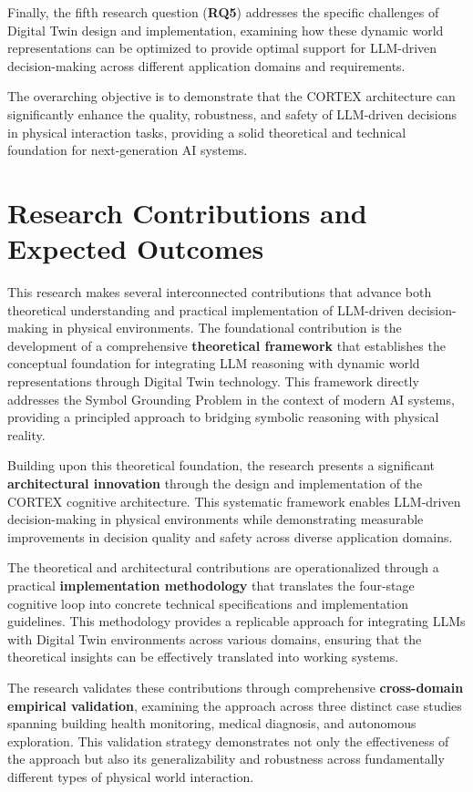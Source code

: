 Finally, the fifth research question (\textbf{RQ5}) addresses the specific challenges of Digital Twin design and implementation, examining how these dynamic world representations can be optimized to provide optimal support for LLM-driven decision-making across different application domains and requirements.

The overarching objective is to demonstrate that the CORTEX architecture can significantly enhance the quality, robustness, and safety of LLM-driven decisions in physical interaction tasks, providing a solid theoretical and technical foundation for next-generation AI systems.

\section{Research Contributions and Expected Outcomes}

This research makes several interconnected contributions that advance both theoretical understanding and practical implementation of LLM-driven decision-making in physical environments. The foundational contribution is the development of a comprehensive \textbf{theoretical framework} that establishes the conceptual foundation for integrating LLM reasoning with dynamic world representations through Digital Twin technology. This framework directly addresses the Symbol Grounding Problem in the context of modern AI systems, providing a principled approach to bridging symbolic reasoning with physical reality.

Building upon this theoretical foundation, the research presents a significant \textbf{architectural innovation} through the design and implementation of the CORTEX cognitive architecture. This systematic framework enables LLM-driven decision-making in physical environments while demonstrating measurable improvements in decision quality and safety across diverse application domains.

The theoretical and architectural contributions are operationalized through a practical \textbf{implementation methodology} that translates the four-stage cognitive loop into concrete technical specifications and implementation guidelines. This methodology provides a replicable approach for integrating LLMs with Digital Twin environments across various domains, ensuring that the theoretical insights can be effectively translated into working systems.

The research validates these contributions through comprehensive \textbf{cross-domain empirical validation}, examining the approach across three distinct case studies spanning building health monitoring, medical diagnosis, and autonomous exploration. This validation strategy demonstrates not only the effectiveness of the approach but also its generalizability and robustness across fundamentally different types of physical world interaction.

